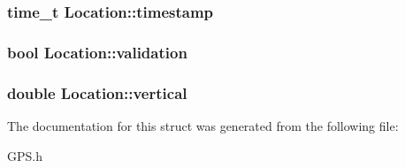 \subsubsection[{timestamp}]{\setlength{\rightskip}{0pt plus 5cm}time\-\_\-t Location\-::timestamp}\label{structLocation_a7ea7fb9fa3ec6fbcd2edc29d5e326726}
\subsubsection[{validation}]{\setlength{\rightskip}{0pt plus 5cm}bool Location\-::validation}\label{structLocation_a34f264a79e761f29c6d5c398bcaaa00e}
\subsubsection[{vertical}]{\setlength{\rightskip}{0pt plus 5cm}double Location\-::vertical}\label{structLocation_abb6f6461f817837bf357cead739e45cc}


The documentation for this struct was generated from the following file\-:\begin{DoxyCompactItemize}
\item 
G\-P\-S.\-h\end{DoxyCompactItemize}
